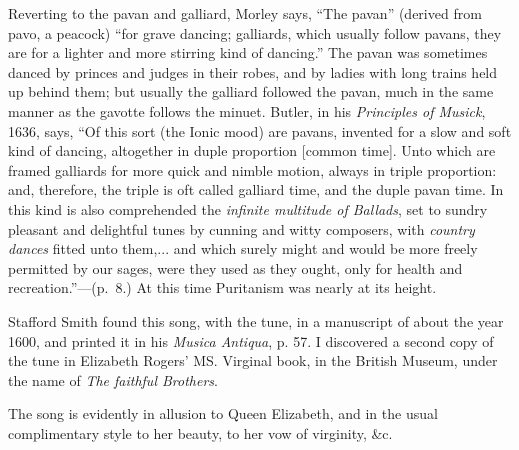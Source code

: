 Reverting to the pavan and galliard, Morley says, “The pavan” (derived from
pavo, a peacock) “for grave dancing; galliards, which usually follow pavans, they
are for a lighter and more stirring kind of dancing.” The pavan was sometimes
danced by princes and judges in their robes, and by ladies with long trains held up
behind them; but usually the galliard followed the pavan, much in the same manner
as the gavotte follows the minuet. Butler, in his \textit{Principles of Musick}, 1636, says,
“Of this sort (the Ionic mood) are pavans, invented for a slow and soft kind of
dancing, altogether in duple proportion [common time]. Unto which are framed
galliards for more quick and nimble motion, always in triple proportion: and,
therefore, the triple is oft called galliard time, and the duple pavan time. In this
kind is also comprehended the \textit{infinite multitude of Ballads}, set to sundry pleasant
and delightful tunes by cunning and witty composers, with \textit{country dances} fitted
unto them,... and which surely might and would be more freely permitted by
our sages, were they used as they ought, only for health and recreation.”—(p.~8.)
At this time Puritanism was nearly at its height.


Stafford Smith found this song, with the tune, in a manuscript of about the year
1600, and printed it in his \textit{Musica Antiqua}, p. 57. I discovered a second copy of
the tune in Elizabeth Rogers’ MS. Virginal book, in the British Museum, under
the name of \textit{The faithful Brothers}.

The song is evidently in allusion to Queen Elizabeth, and in the usual complimentary
style to her beauty, to her vow of virginity, \&c.



\pagebreak

